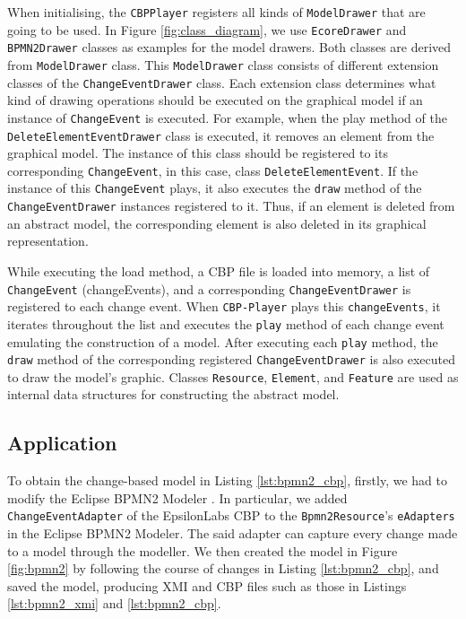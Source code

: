 \documentclass[conference]{IEEEtran}
\begin{document}
When initialising, the \texttt{CBPPlayer} registers all kinds of \texttt{ModelDrawer} that are going to be used. 
In Figure \ref{fig:class_diagram}, we use \texttt{EcoreDrawer} and \texttt{BPMN2Drawer} classes as examples for the model drawers. 
Both classes are derived from \texttt{ModelDrawer} class. This \texttt{ModelDrawer} class consists of 
different extension classes of the \texttt{ChangeEventDrawer} class. Each extension class determines
what kind of drawing operations should be executed on the graphical model if an instance of \texttt{ChangeEvent} is executed.
For example, when the play method of the \texttt{DeleteElementEventDrawer} class is executed,
it removes an element from the graphical model. The instance of this class should be registered to
its corresponding \texttt{ChangeEvent}, in this case, class \texttt{DeleteElementEvent}. 
If the instance of this \texttt{ChangeEvent} plays, it also executes the \texttt{draw} method of 
the \texttt{ChangeEventDrawer} instances registered to it. Thus, if an element is deleted from an abstract model,
the corresponding element is also deleted in its graphical representation. 

While executing the load method, a CBP file is loaded into memory,  
a list of \texttt{ChangeEvent} (changeEvents), and a corresponding \texttt{ChangeEventDrawer} is 
registered to each change event. 
When \texttt{CBP-Player} plays this \texttt{changeEvents}, it iterates throughout the list and executes  
the \texttt{play} method of each change event emulating the construction of a model. 
After executing each \texttt{play} method, the \texttt{draw} method of 
the corresponding registered \texttt{ChangeEventDrawer} is also executed to draw the model's graphic.
Classes \texttt{Resource}, \texttt{Element}, and \texttt{Feature} are used as internal data structures 
for constructing the abstract model.

\subsection{Application}
\label{sec:application}
To obtain the change-based model in Listing \ref{lst:bpmn2_cbp}, firstly, we had to modify
the Eclipse BPMN2 Modeler \cite{eclipse2019bpmn2}. In particular, we added \texttt{ChangeEventAdapter} \cite{epsilonlabs2019changeeventadapter}
of the EpsilonLabs CBP \cite{DBLP:conf/models/YohannisKP17}  to the \texttt{Bpmn2Resource}'s \texttt{eAdapters}
in the Eclipse BPMN2 Modeler. The said adapter can capture every change made to a model through the modeller.
We then created the model in Figure \ref{fig:bpmn2} by following the course of changes in Listing \ref{lst:bpmn2_cbp}, and saved the model, producing XMI and CBP files such as those 
in Listings \ref{lst:bpmn2_xmi} and \ref{lst:bpmn2_cbp}. 
\end{document}
